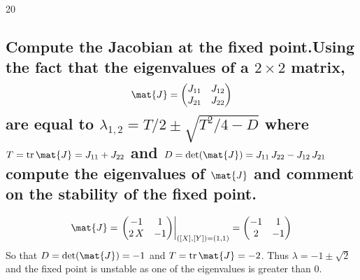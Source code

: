 \documentclass{uosexam2021}    %
\newcommand{\lines}[1]{}
\newcommand{\addspc}{}
\begin{document}
\begin{question}{20}
\begin{parts}
    \part[10]{Compute the Jacobian at the fixed point.Using the fact that the eigenvalues of a
      $2\times2$ matrix,
      \begin{align*}
        \mat{J} =
        \begin{pmatrix}
          J_{11} & J_{12} \\
          J_{21} & J_{22}
        \end{pmatrix}
      \end{align*}
      are equal to
      $\lambda_{1,2} = T/2 \pm \sqrt{T^{2}/4-D}$ where
      $T = \mathop{\mathrm{tr}} \mat{J} = J_{11} + J_{22}$ and
      $D= \det(\mat{J})=J_{11}\,J_{22}-J_{12}\,J_{21}$ compute the
      eigenvalues of $\mat{J}$ and comment on the stability of the fixed
      point.}{\lines{10}}
    \begin{answer}
      \begin{align*}
        \mat{J} =\left.
        \begin{pmatrix}
          -1 & 1\\
          2\,X & -1
        \end{pmatrix}\right|_{([X],[Y])=(1,1)}
                 =
                 \begin{pmatrix}
                   -1 & 1\\
                   2  & -1
                 \end{pmatrix}
      \end{align*}
      So that $D=\det(\mat{J}) = -1$ and $T = \mathop{\mathrm{tr}}
    \mat{J} = -2$. Thus $\lambda = -1 \pm \sqrt{2}$ and the fixed
    point is unstable as one of the eigenvalues is greater than 0.
    \end{answer}
  \end{parts}
\end{question}

\addspc
\clearpage




\end{document}
